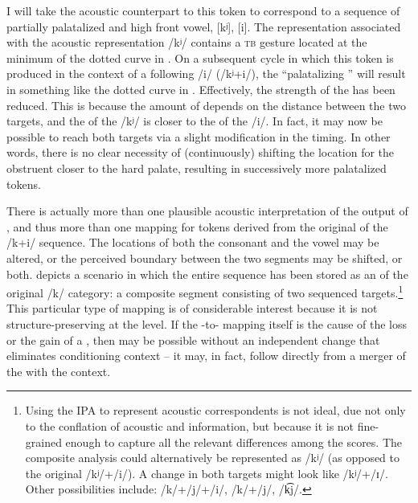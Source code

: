 I will take the acoustic counterpart to this  token to\largerpage
correspond to a sequence of partially palatalized  and high front vowel, 
{[kʲ]}, {[i]}. The  representation associated with the acoustic
representation {/kʲ/} contains a \textsc{tb} gesture located at the
minimum of the dotted curve in . On a subsequent
 cycle in which this token is produced in the context of
a following {/i/} ({/kʲ+i/}), the “palatalizing
” will result in something like the dotted curve in .
Effectively, the strength of the  has been reduced. This is because
the amount of  depends on the distance between the two targets,
and the  of the {/kʲ/} is closer to the  of
the {/i/}. In fact, it may now be possible to reach both
targets via a slight modification in the  timing. In other
words, there is no clear necessity of (continuously) shifting the
 location for the obstruent closer to the hard palate, resulting
in successively more palatalized tokens. 

There is actually more than one plausible acoustic interpretation
of the output of , and thus more than one 
mapping for tokens derived from the original  of the {/k+i/}
sequence. The  locations of both the consonant and the vowel
may be altered, or the perceived boundary between the two segments
may be shifted, or both.  depicts a
scenario in which the entire sequence has been stored as an 
of the original {/k/} category: a composite segment consisting
of two sequenced targets.\footnote{Using the IPA to represent acoustic correspondents is not ideal, due
not only to the conflation of acoustic and  information,
but because it is not fine-grained enough to capture all the relevant
differences among the  scores. The composite analysis could
alternatively be represented as {/kʲ/} (as opposed to the
original {/kʲ/+/i/}). A change in both targets might look
like {/kʲ/+/ɪ/}. Other possibilities include: {/k/+/j/+/i/},
{/k/+/j/}, {/k͡j/}.} This particular type of mapping is of considerable interest because
it is not structure-preserving at the  level. If the -to- mapping itself is the cause of the loss or the
gain of a , then  may be possible without an independent
change that eliminates conditioning context – it may, in fact, follow
directly from a merger of the  with the  context. 

